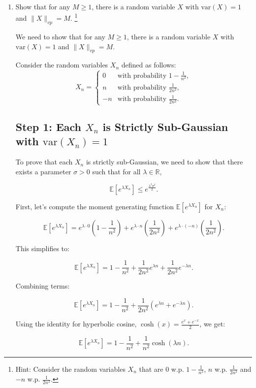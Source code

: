 \documentclass[a4 paper]{article}
\theoremstyle{boldStyle}
\theoremstyle{boldBlueStyle}
\theoremstyle{boldPurpleStyle}
\theoremstyle{boldRedStyle}
\begin{document}
\begin{enumerate}
\newpage
\item \textcolor{blueColor}{Show that for any \(M \geq 1\), there is a random variable \(X\) with \(\mathrm{var}(X) = 1\) and \(\|X\|_{vp} = M\).}
\footnote{Hint: Consider the random variables \(X_n\) that are 0 w.p. \(1-\frac{1}{n^2}\), \(n\) w.p. \(\frac{1}{2n^2}\) and \(-n\) w.p. \(\frac{1}{2n^2}\).}




We need to show that for any \(M \geq 1\), there is a random variable \(X\) with \(\mathrm{var}(X) = 1\) and \(\|X\|_{vp} = M\).

Consider the random variables \(X_n\) defined as follows:
\[
X_n = \begin{cases} 
0 & \text{with probability } 1 - \frac{1}{n^2}, \\
n & \text{with probability } \frac{1}{2n^2}, \\
-n & \text{with probability } \frac{1}{2n^2}.
\end{cases}
\]


\subsection*{Step 1: Each \(X_n\) is Strictly Sub-Gaussian with \(\mathrm{var}(X_n) = 1\)}


To prove that each \(X_n\) is strictly sub-Gaussian, we need to show that there exists a parameter \(\sigma > 0\) such that for all \(\lambda \in \mathbb{R}\),

\[
\mathbb{E}\left[e^{\lambda X_n}\right] \leq e^{\frac{\lambda^2 \sigma^2}{2}}.
\]

First, let's compute the moment generating function \(\mathbb{E}[e^{\lambda X_n}]\) for \(X_n\):

\[
\mathbb{E}[e^{\lambda X_n}] = e^{\lambda \cdot 0} \left(1 - \frac{1}{n^2}\right) + e^{\lambda \cdot n} \left(\frac{1}{2n^2}\right) + e^{\lambda \cdot (-n)} \left(\frac{1}{2n^2}\right).
\]

This simplifies to:

\[
\mathbb{E}[e^{\lambda X_n}] = 1 - \frac{1}{n^2} + \frac{1}{2n^2} e^{\lambda n} + \frac{1}{2n^2} e^{-\lambda n}.
\]

Combining terms:

\[
\mathbb{E}[e^{\lambda X_n}] = 1 - \frac{1}{n^2} + \frac{1}{2n^2} (e^{\lambda n} + e^{-\lambda n}).
\]

Using the identity for hyperbolic cosine, \(\cosh(x) = \frac{e^x + e^{-x}}{2}\), we get:

\[
\mathbb{E}[e^{\lambda X_n}] = 1 - \frac{1}{n^2} + \frac{1}{n^2} \cosh(\lambda n).
\]



\end{enumerate}
\end{document}
